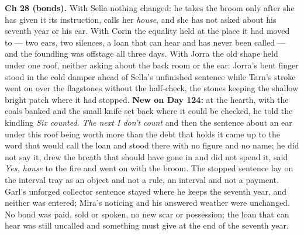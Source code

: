 \documentclass{design/chronicle}
\begin{document}
{\textbf{Ch 28 (bonds).} With Sella nothing changed: he takes the broom only after she has given it its instruction, calls her \emph{house}, and she has not asked about his seventh year or his ear. With Corin the equality held at the place it had moved to — two ears, two silences, a loan that can hear and has never been called — and the foundling was offstage all three days. With Jorra the old shape held under one roof, neither asking about the back room or the ear: Jorra’s bent finger stood in the cold damper ahead of Sella’s unfinished sentence while Tarn’s stroke went on over the flagstones without the half-check, the stones keeping the shallow bright patch where it had stopped. \textbf{New on Day 124:} at the hearth, with the coals banked and the small knife set back where it could be checked, he told the kindling \emph{Six counted. The next I don’t count} and then the sentence about an ear under this roof being worth more than the debt that holds it came up to the word that would call the loan and stood there with no figure and no name; he did not say it, drew the breath that should have gone in and did not spend it, said \emph{Yes, house} to the fire and went on with the broom. The stopped sentence lay on the interval tray as an object and not a rule, an interval and not a payment. Garl’s unforged collector sentence stayed where he keeps the seventh year, and neither was entered; Mira’s noticing and his answered weather were unchanged. No bond was paid, sold or spoken, no new scar or possession; the loan that can hear was still uncalled and something must give at the end of the seventh year.

}
\end{document}
